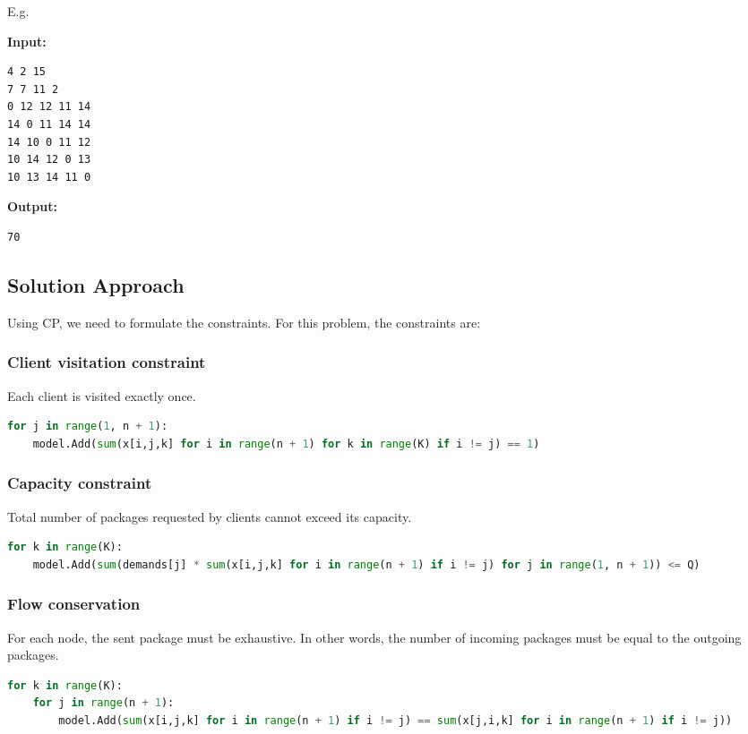 \documentclass{article}
\begin{document}
E.g.

\begin{multicols}{2}
\textbf{Input:}
\begin{verbatim}
4 2 15
7 7 11 2
0 12 12 11 14
14 0 11 14 14
14 10 0 11 12
10 14 12 0 13
10 13 14 11 0
\end{verbatim}
\columnbreak
\textbf{Output:}
\begin{verbatim}
70
\end{verbatim}
\end{multicols}


\subsection{Solution Approach}
Using CP, we need to formulate the constraints. For this problem, the constraints are:
\subsubsection{Client visitation constraint}
Each client is visited exactly once.
\begin{lstlisting}[language=Python]
for j in range(1, n + 1):
    model.Add(sum(x[i,j,k] for i in range(n + 1) for k in range(K) if i != j) == 1)
\end{lstlisting}

\subsubsection{Capacity constraint}
Total number of packages requested by clients cannot exceed its capacity.
\begin{lstlisting}[language=Python]
for k in range(K):
    model.Add(sum(demands[j] * sum(x[i,j,k] for i in range(n + 1) if i != j) for j in range(1, n + 1)) <= Q)
\end{lstlisting}

\subsubsection{Flow conservation}
For each node, the sent package must be exhaustive. In other words, the number of incoming packages must be equal to the outgoing packages.
\begin{lstlisting}[language=Python]
for k in range(K):
    for j in range(n + 1):
        model.Add(sum(x[i,j,k] for i in range(n + 1) if i != j) == sum(x[j,i,k] for i in range(n + 1) if i != j))
\end{lstlisting}
\end{document}
